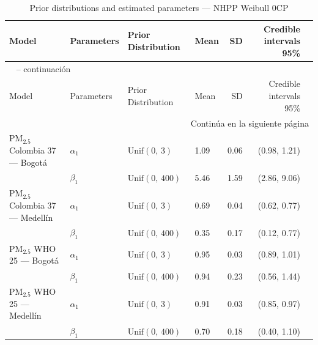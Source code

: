 \begin{longtable}{llllrrr}
\caption{Prior distributions and estimated parameters --- NHPP Weibull 0CP} \label{tab:nhpp_params_0cp} \\
\toprule
Model & Parameters & Prior Distribution & Mean & SD & Credible intervals 95\% \\
\midrule
\endfirsthead

\multicolumn{7}{l}{\tablename\ \thetable{} -- continuaci\'{o}n} \\
\toprule
Model & Parameters & Prior Distribution & Mean & SD & Credible intervals 95\% \\
\midrule
\endhead

\midrule
\multicolumn{7}{r}{Contin\'{u}a en la siguiente p\'{a}gina} \\
\endfoot

\bottomrule
\endlastfoot

PM$_{2.5}$ Colombia 37 --- Bogot\'{a} & $\alpha_{1}$ & $\text{Unif}(0,\,3)$ & 1.09 & 0.06 & (0.98, 1.21) \\
 & $\beta_{1}$ & $\text{Unif}(0,\,400)$ & 5.46 & 1.59 & (2.86, 9.06) \\
\midrule
PM$_{2.5}$ Colombia 37 --- Medell\'{i}n & $\alpha_{1}$ & $\text{Unif}(0,\,3)$ & 0.69 & 0.04 & (0.62, 0.77) \\
 & $\beta_{1}$ & $\text{Unif}(0,\,400)$ & 0.35 & 0.17 & (0.12, 0.77) \\
\midrule
PM$_{2.5}$ WHO 25 --- Bogot\'{a} & $\alpha_{1}$ & $\text{Unif}(0,\,3)$ & 0.95 & 0.03 & (0.89, 1.01) \\
 & $\beta_{1}$ & $\text{Unif}(0,\,400)$ & 0.94 & 0.23 & (0.56, 1.44) \\
\midrule
PM$_{2.5}$ WHO 25 --- Medell\'{i}n & $\alpha_{1}$ & $\text{Unif}(0,\,3)$ & 0.91 & 0.03 & (0.85, 0.97) \\
 & $\beta_{1}$ & $\text{Unif}(0,\,400)$ & 0.70 & 0.18 & (0.40, 1.10) \\
\end{longtable}
